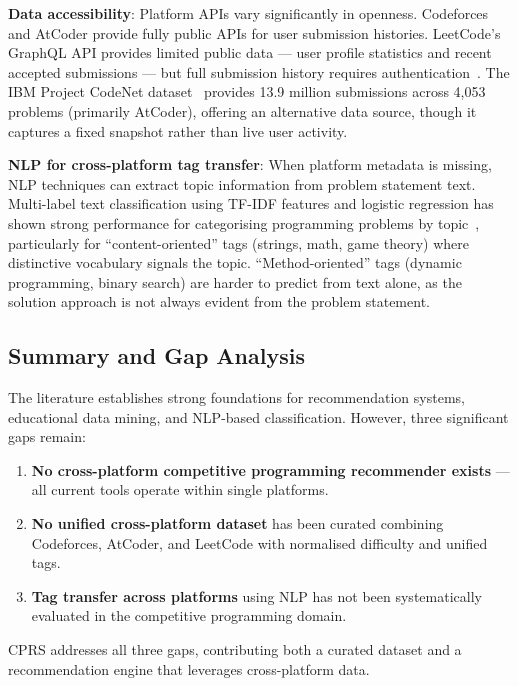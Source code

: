 \documentclass[12pt,a4paper]{article}
\begin{document}
\textbf{Data accessibility}: Platform APIs vary significantly in openness. Codeforces and AtCoder provide fully public APIs for user submission histories. LeetCode's GraphQL API provides limited public data --- user profile statistics and recent accepted submissions --- but full submission history requires authentication~\cite{leetcode2024}. The IBM Project CodeNet dataset~\cite{puri2021} provides 13.9 million submissions across 4,053 problems (primarily AtCoder), offering an alternative data source, though it captures a fixed snapshot rather than live user activity.

\textbf{NLP for cross-platform tag transfer}: When platform metadata is missing, NLP techniques can extract topic information from problem statement text. Multi-label text classification using TF-IDF features and logistic regression has shown strong performance for categorising programming problems by topic~\cite{agrawal2020}, particularly for ``content-oriented'' tags (strings, math, game theory) where distinctive vocabulary signals the topic. ``Method-oriented'' tags (dynamic programming, binary search) are harder to predict from text alone, as the solution approach is not always evident from the problem statement.

\subsection{Summary and Gap Analysis}

The literature establishes strong foundations for recommendation systems, educational data mining, and NLP-based classification. However, three significant gaps remain:

\begin{enumerate}
    \item \textbf{No cross-platform competitive programming recommender exists} --- all current tools operate within single platforms.
    \item \textbf{No unified cross-platform dataset} has been curated combining Codeforces, AtCoder, and LeetCode with normalised difficulty and unified tags.
    \item \textbf{Tag transfer across platforms} using NLP has not been systematically evaluated in the competitive programming domain.
\end{enumerate}

CPRS addresses all three gaps, contributing both a curated dataset and a recommendation engine that leverages cross-platform data.
\end{document}
